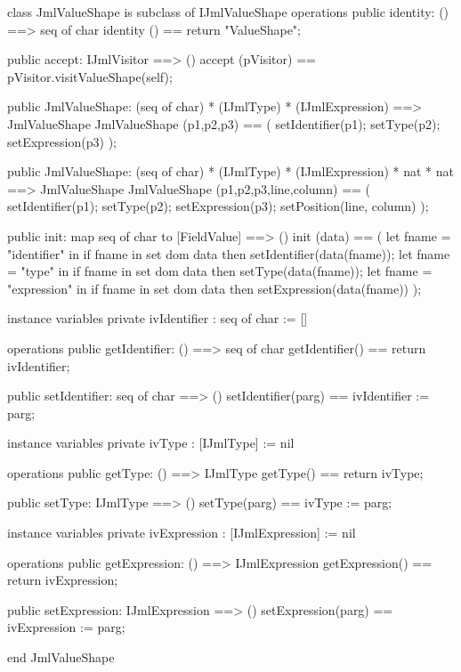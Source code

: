 \begin{vdm_al}
class JmlValueShape is subclass of IJmlValueShape
operations
  public identity: () ==> seq of char
  identity () == return "ValueShape";

  public accept: IJmlVisitor ==> ()
  accept (pVisitor) == pVisitor.visitValueShape(self);

  public JmlValueShape:
    (seq of char) *
    (IJmlType) *
    (IJmlExpression) ==> JmlValueShape
  JmlValueShape (p1,p2,p3) == 
    ( setIdentifier(p1);
      setType(p2);
      setExpression(p3) );

  public JmlValueShape:
    (seq of char) *
    (IJmlType) *
    (IJmlExpression) *
    nat *
    nat ==> JmlValueShape
  JmlValueShape (p1,p2,p3,line,column) == 
    ( setIdentifier(p1);
      setType(p2);
      setExpression(p3);
      setPosition(line, column) );

  public init: map seq of char to [FieldValue] ==> ()
  init (data) ==
    ( let fname = "identifier" in
        if fname in set dom data
        then setIdentifier(data(fname));
      let fname = "type" in
        if fname in set dom data
        then setType(data(fname));
      let fname = "expression" in
        if fname in set dom data
        then setExpression(data(fname)) );

instance variables
  private ivIdentifier : seq of char := []

operations
  public getIdentifier: () ==> seq of char
  getIdentifier() == return ivIdentifier;

  public setIdentifier: seq of char ==> ()
  setIdentifier(parg) == ivIdentifier := parg;

instance variables
  private ivType : [IJmlType] := nil

operations
  public getType: () ==> IJmlType
  getType() == return ivType;

  public setType: IJmlType ==> ()
  setType(parg) == ivType := parg;

instance variables
  private ivExpression : [IJmlExpression] := nil

operations
  public getExpression: () ==> IJmlExpression
  getExpression() == return ivExpression;

  public setExpression: IJmlExpression ==> ()
  setExpression(parg) == ivExpression := parg;

end JmlValueShape
\end{vdm_al}

